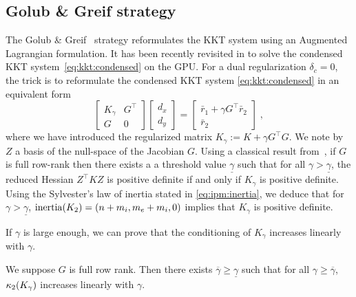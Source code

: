 \subsection{Golub \& Greif strategy}
\label{sec:kkt:golubgreif}
The Golub \& Greif~\cite{golub2003solving} strategy reformulates the KKT system
using an Augmented Lagrangian formulation.
It has been recently revisited in \cite{regev2023hykkt}
to solve the condensed KKT system~\eqref{eq:kkt:condensed} on the GPU.
For a dual regularization $\delta_c = 0$,
the trick is to reformulate the condensed KKT system \eqref{eq:kkt:condensed} in an equivalent form
\begin{equation}
  \label{eq:kkt:hykkt}
  \begin{bmatrix}
    K_\gamma & G^\top \\
    G & 0
  \end{bmatrix}
  \begin{bmatrix}
    d_x \\ d_y
  \end{bmatrix}
  =
  \begin{bmatrix}
    \bar{r}_1 + \gamma G^\top \bar{r}_2 \\
    \bar{r}_2
  \end{bmatrix} \; ,
\end{equation}
where we have introduced the regularized matrix $K_\gamma := K + \gamma G^\top G$.
We note by $Z$ a basis of the null-space of the Jacobian $G$.
Using a classical result from~\cite{debreu1952definite},
if $G$ is full row-rank then there
exists a a threshold value $\underline{\gamma}$ such that
for all $\gamma > \underline{\gamma}$, the reduced Hessian $Z^\top K Z$
is positive definite if and only if $K_\gamma$ is positive definite.
Using the Sylvester's law of inertia stated in \eqref{eq:ipm:inertia}, we deduce
that for $\gamma > \underline{\gamma}$, $\operatorname{inertia}(K_2) = (n + m_i, m_e +m_i, 0)$
implies that $K_\gamma$ is positive definite.

If $\gamma$ is large enough, we can prove that the conditioning
of $K_\gamma$ increases linearly with $\gamma$.
\begin{proposition}
  \label{prop:kkt:hykkt:cond}
  We suppose $G$ is full row rank. Then there exists $\overline{\gamma}
  \geq \underline{\gamma}$ such that for all $\gamma \geq \overline{\gamma}$,
  $\kappa_2(K_\gamma)$ increases linearly with $\gamma$.
\end{proposition}

